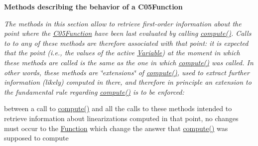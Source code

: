 \begin{Indent}\textbf{ Methods describing the behavior of a C05\+Function}\par
{\em The methods in this section allow to retrieve first-\/order information about the point where the \mbox{\hyperlink{class_s_m_spp__di__unipi__it_1_1_c05_function}{C05\+Function}} have been last evaluated by calling \mbox{\hyperlink{class_s_m_spp__di__unipi__it_1_1_function_a504d4e3e174c7a518cc66156a8a45ce5}{compute()}}. Calls to to any of these methods are therefore associated with that point\+: it is expected that the point (i.\+e., the values of the active \mbox{\hyperlink{class_s_m_spp__di__unipi__it_1_1_variable}{Variable}}) at the moment in which these methods are called is the same as the one in which \mbox{\hyperlink{class_s_m_spp__di__unipi__it_1_1_function_a504d4e3e174c7a518cc66156a8a45ce5}{compute()}} was called. In other words, these methods are \char`\"{}extensions\char`\"{} of \mbox{\hyperlink{class_s_m_spp__di__unipi__it_1_1_function_a504d4e3e174c7a518cc66156a8a45ce5}{compute()}}, used to extract further information (likely) computed in there, and therefore in principle an extension to the fundamental rule regarding \mbox{\hyperlink{class_s_m_spp__di__unipi__it_1_1_function_a504d4e3e174c7a518cc66156a8a45ce5}{compute()}} is to be enforced\+:

between a call to \mbox{\hyperlink{class_s_m_spp__di__unipi__it_1_1_function_a504d4e3e174c7a518cc66156a8a45ce5}{compute()}} and all the calls to these methods intended to retrieve information about linearizations computed in that point, no changes must occur to the \mbox{\hyperlink{class_s_m_spp__di__unipi__it_1_1_function}{Function}} which change the answer that \mbox{\hyperlink{class_s_m_spp__di__unipi__it_1_1_function_a504d4e3e174c7a518cc66156a8a45ce5}{compute()}} was supposed to compute

}
\end{Indent}
